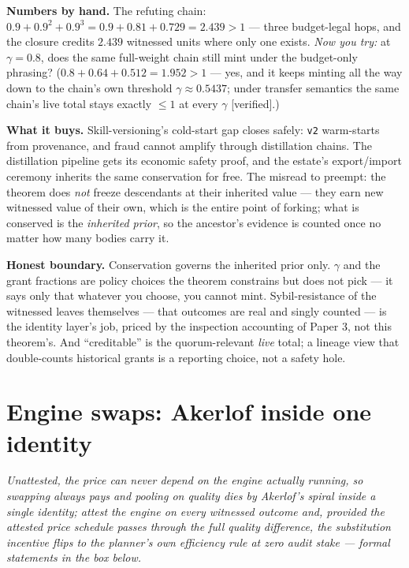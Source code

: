 \documentclass[11pt,a4paper]{article}
\newcommand{\onebreath}[1]{\begin{center}\emph{#1}\end{center}}
\begin{document}
\textbf{Numbers by hand.} The refuting chain: $0.9+0.9^2+0.9^3=0.9+0.81+0.729=2.439>1$ --- three budget-legal hops, and the closure
credits $2.439$ witnessed units where only one exists. \emph{Now you try:} at $\gamma=0.8$, does the same full-weight chain still
mint under the budget-only phrasing? ($0.8+0.64+0.512=1.952>1$ --- yes, and it keeps minting all the way down to the chain's own
threshold $\gamma\approx0.5437$; under transfer semantics the same chain's live total stays exactly $\le 1$ at every $\gamma$
[verified].)







\textbf{What it buys.} Skill-versioning's cold-start gap closes safely: \texttt{v2} warm-starts from provenance, and fraud cannot
amplify through distillation chains. The distillation pipeline gets its economic safety proof, and the estate's export/import
ceremony inherits the same conservation for free. The misread to preempt: the theorem does \emph{not} freeze descendants at their
inherited value --- they earn new witnessed value of their own, which is the entire point of forking; what is conserved is the
\emph{inherited prior}, so the ancestor's evidence is counted once no matter how many bodies carry it.

\begin{boundary}
\textbf{Honest boundary.} Conservation governs the inherited prior only. $\gamma$ and the grant fractions are policy choices the
theorem constrains but does not pick --- it says only that whatever you choose, you cannot mint. Sybil-resistance of the witnessed
leaves themselves --- that outcomes are real and singly counted --- is the identity layer's job, priced by the inspection accounting
of Paper 3, not this theorem's. And ``creditable'' is the quorum-relevant \emph{live} total; a lineage view that double-counts
historical grants is a reporting choice, not a safety hole.
\end{boundary}

\section{Engine swaps: Akerlof inside one identity}\label{sec:engine}

\onebreath{Unattested, the price can never depend on the engine actually running, so swapping always pays and pooling on quality
dies by Akerlof's spiral inside a single identity; attest the engine on every witnessed outcome and, provided the attested price
schedule passes through the full quality difference, the substitution incentive flips to the planner's own efficiency rule at
zero audit stake --- formal statements in the box below.}
\end{document}
